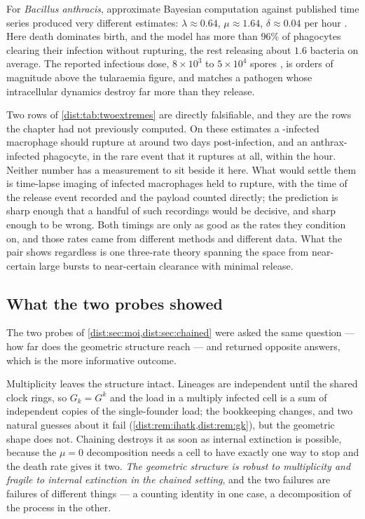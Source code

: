 For \textit{Bacillus anthracis}, approximate Bayesian computation against
published time series produced very different estimates:
$\lambda\approx0.64$, $\mu\approx1.64$, $\delta\approx0.04$ per hour
\cite{williams2021anthrax}. Here death dominates birth, and the model has more
than $96\%$ of phagocytes clearing their infection without rupturing, the rest
releasing about $1.6$ bacteria on average. The reported infectious dose,
$8\times10^3$ to $5\times10^4$ spores \cite{williams2021anthrax}, is orders of
magnitude above the tularaemia figure, and matches a pathogen whose
intracellular dynamics destroy far more than they release.

Two rows of \cref{dist:tab:twoextremes} are directly falsifiable, and they are
the rows the chapter had not previously computed. On these estimates a
\ft{}-infected macrophage should rupture at around two days post-infection,
and an anthrax-infected phagocyte, in the rare event that it ruptures at all,
within the hour. Neither number has a measurement to sit beside it here. What
would settle them is time-lapse imaging of infected macrophages held to
rupture, with the time of the release event recorded and the payload counted
directly; the prediction is sharp enough that a handful of such recordings
would be decisive, and sharp enough to be wrong.
Both timings are only as good as the rates they condition on, and those rates
came from different methods and different data. What the pair shows regardless
is one three-rate theory spanning the space from near-certain large bursts to
near-certain clearance with minimal release.

\subsection{What the two probes showed}
\label{dist:sec:probes}

The two probes of \cref{dist:sec:moi,dist:sec:chained} were asked the same
question --- how far does the geometric structure reach --- and returned
opposite answers, which is the more informative outcome.

Multiplicity leaves the structure intact. Lineages are independent until the
shared clock rings, so $G_k=G^k$ and the load in a multiply infected cell is a
sum of independent copies of the single-founder load; the bookkeeping changes,
and two natural guesses about it fail
(\cref{dist:rem:ihatk,dist:rem:gk}), but the geometric shape does not.
Chaining destroys it as soon as internal extinction is possible, because the
$\mu=0$ decomposition needs a cell to have exactly one way to stop and the
death rate gives it two. \emph{The geometric structure is robust to
multiplicity and fragile to internal extinction in the chained setting}, and
the two failures are failures of different things --- a
counting identity in one case, a decomposition of the process in the other.

